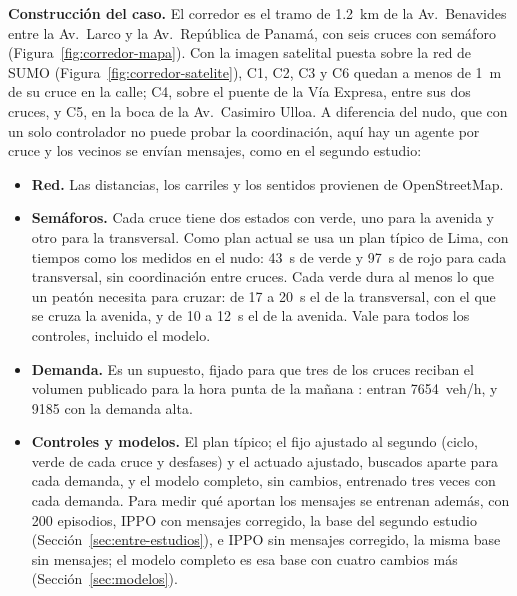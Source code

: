 \noindent\textbf{Construcción del caso.} El corredor es el tramo de
1.2~km de la Av.~Benavides entre la Av.~Larco y la Av.~República de
Panamá, con seis cruces con semáforo (Figura~\ref{fig:corredor-mapa}).
Con la imagen satelital puesta sobre la red de SUMO
(Figura~\ref{fig:corredor-satelite}), C1, C2, C3 y C6 quedan a menos de
1~m de su cruce en la calle; C4, sobre el puente de la Vía Expresa,
entre sus dos cruces, y C5, en la boca de la Av.~Casimiro Ulloa. A
diferencia del nudo, que con un solo controlador no puede probar la
coordinación, aquí hay un agente por cruce y los vecinos se envían
mensajes, como en el segundo estudio:
\begin{itemize}
  \item \textbf{Red.} Las distancias, los carriles y los sentidos provienen de OpenStreetMap.
  \item \textbf{Semáforos.} Cada cruce tiene dos estados con verde, uno
    para la avenida y otro para la transversal. Como plan actual se usa
    un plan típico de Lima, con tiempos como los medidos en el nudo:
    43~s de verde y 97~s de rojo para cada transversal, sin coordinación
    entre cruces. Cada verde
    dura al menos lo que un peatón necesita para cruzar: de 17 a 20~s el
    de la transversal, con el que se cruza la avenida, y de 10 a 12~s el
    de la avenida. Vale para todos los controles, incluido el modelo.
  \item \textbf{Demanda.} Es un supuesto, fijado para que tres de los
    cruces reciban el volumen publicado para la hora punta de la mañana
    \citep{Miraflores2017_PMU}: entran 7654~veh/h, y 9185 con la demanda
    alta.
  \item \textbf{Controles y modelos.} El plan típico; el fijo ajustado
    al segundo (ciclo, verde de cada cruce y desfases) y el actuado
    ajustado, buscados aparte para cada demanda, y el modelo completo,
    sin cambios, entrenado tres veces con cada demanda. Para medir qué
    aportan los mensajes se entrenan además, con 200 episodios, IPPO con
    mensajes corregido, la base del segundo estudio
    (Sección~\ref{sec:entre-estudios}), e IPPO sin mensajes corregido, la
    misma base sin mensajes; el modelo completo es esa base con cuatro
    cambios más (Sección~\ref{sec:modelos}).
\end{itemize}

